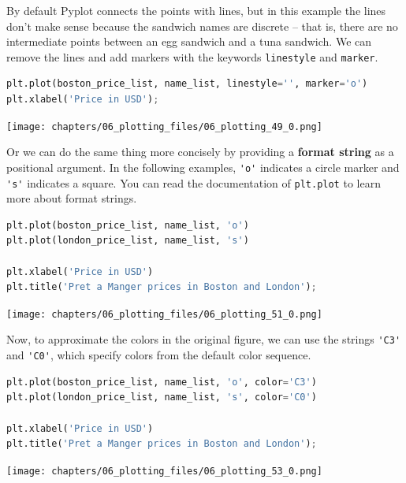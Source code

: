 By default Pyplot connects the points with lines, but in this example
the lines don't make sense because the sandwich names are discrete --
that is, there are no intermediate points between an egg sandwich and a
tuna sandwich. We can remove the lines and add markers with the keywords
\passthrough{\lstinline!linestyle!} and
\passthrough{\lstinline!marker!}.

\begin{lstlisting}[language=Python,style=source]
plt.plot(boston_price_list, name_list, linestyle='', marker='o')
plt.xlabel('Price in USD');
\end{lstlisting}

\begin{center}
\texttt{[image: chapters/06\_plotting\_files/06\_plotting\_49\_0.png]}
\end{center}

Or we can do the same thing more concisely by providing a \textbf{format
string} as a positional argument. In the following examples,
\passthrough{\lstinline!'o'!} indicates a circle marker and
\passthrough{\lstinline!'s'!} indicates a square. You can read the
documentation of \passthrough{\lstinline!plt.plot!} to learn more about
format strings.

\begin{lstlisting}[language=Python,style=source]
plt.plot(boston_price_list, name_list, 'o')
plt.plot(london_price_list, name_list, 's')

plt.xlabel('Price in USD')
plt.title('Pret a Manger prices in Boston and London');
\end{lstlisting}

\begin{center}
\texttt{[image: chapters/06\_plotting\_files/06\_plotting\_51\_0.png]}
\end{center}

Now, to approximate the colors in the original figure, we can use the
strings \passthrough{\lstinline!'C3'!} and
\passthrough{\lstinline!'C0'!}, which specify colors from the default
color sequence.

\begin{lstlisting}[language=Python,style=source]
plt.plot(boston_price_list, name_list, 'o', color='C3')
plt.plot(london_price_list, name_list, 's', color='C0')

plt.xlabel('Price in USD')
plt.title('Pret a Manger prices in Boston and London');
\end{lstlisting}

\begin{center}
\texttt{[image: chapters/06\_plotting\_files/06\_plotting\_53\_0.png]}
\end{center}

